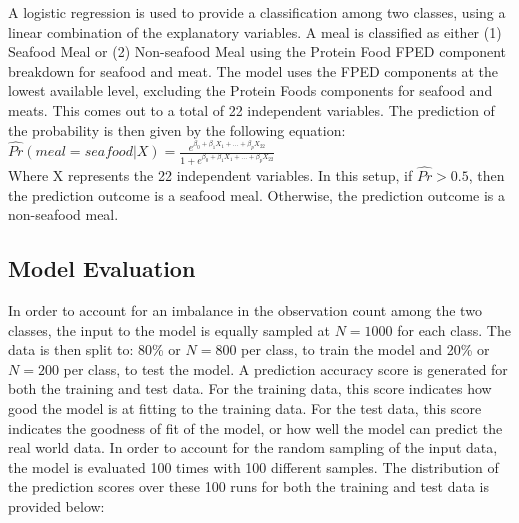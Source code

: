 \documentclass{article}
\begin{document}
A logistic regression is used to provide a classification among two classes, using a linear combination of the explanatory variables. A meal is classified as either (1) Seafood Meal or (2) Non-seafood Meal using the Protein Food FPED component breakdown for seafood and meat. The model uses the FPED components at the lowest available level, excluding the Protein Foods components for seafood and meats. This comes out to a total of 22 independent variables. The prediction of the probability is then given by the following equation:\\

$\hat{Pr}(meal = seafood | X) = \frac{e^{\beta_0 + \beta_1X_1 + ... + \beta_pX_{22}}}{1 + e^{\beta_0 + \beta_1X_1 + ... + \beta_pX_{22}}}$\\

Where X represents the 22 independent variables. In this setup, if $\hat{Pr} > 0.5$, then the prediction outcome is a seafood meal. Otherwise, the prediction outcome is a non-seafood meal. 

\subsection{Model Evaluation}
\label{ssec:subhead}

In order to account for an imbalance in the observation count among the two classes, the input to the model is equally sampled at $N = 1000$ for each class. The data is then split to: 80\% or $N=800$ per class, to train the model and 20\% or $N=200$ per class, to test the model. A prediction accuracy score is generated for both the training and test data. For the training data, this score indicates how good the model is at fitting to the training data. For the test data, this score indicates the goodness of fit of the model, or how well the model can predict the real world data. In order to account for the random sampling of the input data, the model is evaluated 100 times with 100 different samples. The distribution of the prediction scores over these 100 runs for both the training and test data is provided below:\\
\end{document}
